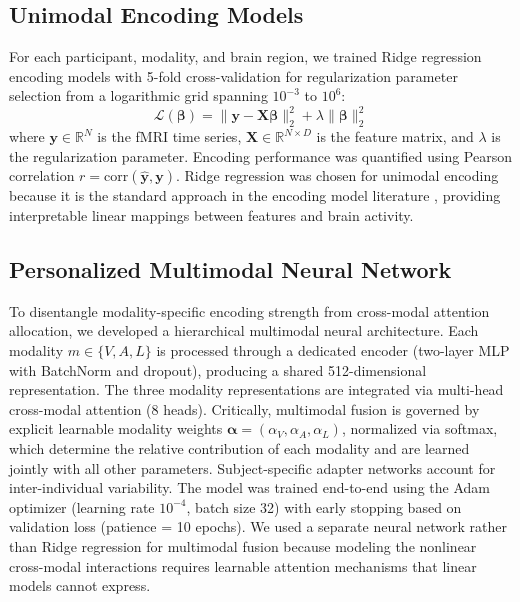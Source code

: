 \documentclass[conference]{IEEEtran}
\begin{document}
\subsection{Unimodal Encoding Models}

For each participant, modality, and brain region, we trained Ridge regression encoding models with 5-fold cross-validation for regularization parameter selection from a logarithmic grid spanning $10^{-3}$ to $10^{6}$:
\begin{equation}\label{eq:L}
\mathcal{L}(\boldsymbol{\beta}) =
\lVert \mathbf{y} - \mathbf{X}\boldsymbol{\beta} \rVert_2^2
+ \lambda \lVert \boldsymbol{\beta} \rVert_2^2
\end{equation}
where $\mathbf{y} \in \mathbb{R}^N$ is the fMRI time series, $\mathbf{X} \in \mathbb{R}^{N \times D}$ is the feature matrix, and $\lambda$ is the regularization parameter. Encoding performance was quantified using Pearson correlation $r = \mathrm{corr}(\hat{\mathbf{y}}, \mathbf{y})$. Ridge regression was chosen for unimodal encoding because it is the standard approach in the encoding model literature \cite{naselaris2011encoding}, providing interpretable linear mappings between features and brain activity.

\subsection{Personalized Multimodal Neural Network}

To disentangle modality-specific encoding strength from cross-modal attention allocation, we developed a hierarchical multimodal neural architecture. Each modality $m \in \{V, A, L\}$ is processed through a dedicated encoder (two-layer MLP with BatchNorm and dropout), producing a shared 512-dimensional representation. The three modality representations are integrated via multi-head cross-modal attention \cite{vaswani2017attention} (8 heads). Critically, multimodal fusion is governed by explicit learnable modality weights $\boldsymbol{\alpha} = (\alpha_V, \alpha_A, \alpha_L)$, normalized via softmax, which determine the relative contribution of each modality and are learned jointly with all other parameters. Subject-specific adapter networks account for inter-individual variability. The model was trained end-to-end using the Adam optimizer (learning rate $10^{-4}$, batch size 32) with early stopping based on validation loss (patience = 10 epochs). We used a separate neural network rather than Ridge regression for multimodal fusion because modeling the nonlinear cross-modal interactions requires learnable attention mechanisms that linear models cannot express.
\end{document}

